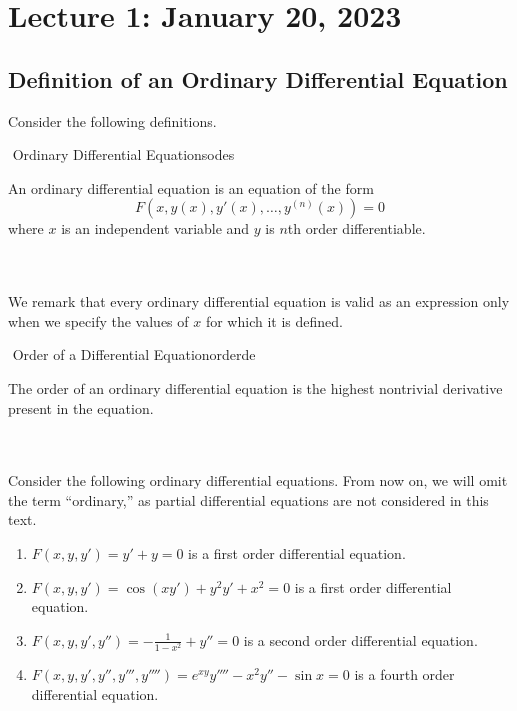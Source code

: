 \section{Lecture 1: January 20, 2023}

    \subsection{Definition of an Ordinary Differential Equation}

        Consider the following definitions.
        \begin{definition}{\Stop\,\,Ordinary Differential Equations}{odes}

            An ordinary differential equation is an equation of the form
            \begin{equation*}
                F(x,y(x),y'(x),\ldots,y^{(n)}(x))=0
            \end{equation*}
            where \(x\) is an independent variable and \(y\) is \(n\)th order differentiable.
            
        \end{definition}
        \vphantom
        \\
        \\
        We remark that every ordinary differential equation is valid as an expression only when we specify the values of \(x\) for which it is defined.
        \begin{definition}{\Stop\,\,Order of a Differential Equation}{orderde}

            The order of an ordinary differential equation is the highest nontrivial derivative present in the equation.
            
        \end{definition}
        \vphantom
        \\
        \\
        Consider the following ordinary differential equations. From now on, we will omit the term ``ordinary,'' as partial differential equations are not considered in this text.
        \begin{enumerate}
            \item \(F(x,y,y')=y'+y=0\) is a first order differential equation.
            \item \(F(x,y,y')=\cos(xy')+y^2y'+x^2=0\) is a first order differential equation.
            \item \(F(x,y,y',y'')=-\frac{1}{1-x^2}+y''=0\) is a second order differential equation.
            \item \(F(x,y,y',y'',y''',y'''')=e^{xy}y''''-x^2y''-\sin x=0\) is a fourth order differential equation.
        \end{enumerate}
